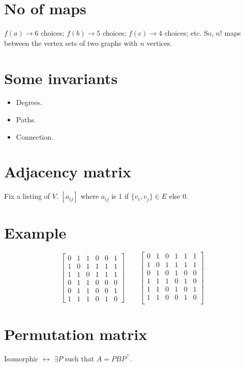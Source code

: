 \documentclass{notes}
\begin{document}
  \section*{No of maps}
    \(f(a) \rightarrow 6\) choices; \(f(b) \rightarrow 5\) choices; \(f(c) \rightarrow 4\) choices; etc.
    So, \(n!\) maps between the vertex sets of two graphs with \(n\) vertices.
  
  \section*{Some invariants}
    \begin{itemize}
      \item Degrees.
      \item Paths.
      \item Connection.
    \end{itemize}

  \section*{Adjacency matrix}
    Fix a listing of \(V\).
    \([a_{ij}]\) where \(a_{ij}\) is 1 if \(\{v_i,v_j\} \in E \) else 0.
  
  \section*{Example}
  \[
    \begin{bmatrix}
      0 & 1 & 1 & 0 & 0 & 1 \\
      1 & 0 & 1 & 1 & 1 & 1 \\
      1 & 1 & 0 & 1 & 1 & 1 \\
      0 & 1 & 1 & 0 & 0 & 0 \\
      0 & 1 & 1 & 0 & 0 & 1 \\
      1 & 1 & 1 & 0 & 1 & 0 
    \end{bmatrix}
    \qquad
    \begin{bmatrix}
      0 & 1 & 0 & 1 & 1 & 1 \\
      1 & 0 & 1 & 1 & 1 & 1 \\
      0 & 1 & 0 & 1 & 0 & 0 \\
      1 & 1 & 1 & 0 & 1 & 0 \\
      1 & 1 & 0 & 1 & 0 & 1 \\
      1 & 1 & 0 & 0 & 1 & 0 \\
    \end{bmatrix}
  \]

  \section*{Permutation matrix}
  Isomorphic \(\leftrightarrow\) \(\exists P\) such that \(A = PBP^\intercal\).
\end{document}
